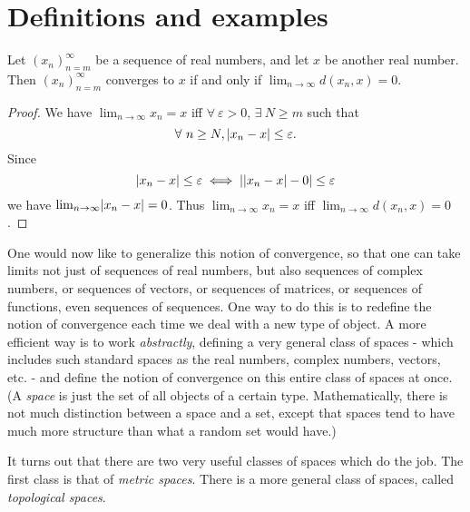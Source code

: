 \section{Definitions and examples}\label{sec 1.1}

\begin{lemma}\label{1.1.1}
    Let \((x_n)_{n = m}^\infty\) be a sequence of real numbers, and let \(x\) be another real number.
    Then \((x_n)_{n = m}^\infty\) converges to \(x\) if and only if \(\lim_{n \to \infty} d(x_n, x) = 0\).
\end{lemma}

\begin{proof}
    We have \(\lim_{n \to \infty} x_n = x\) iff \(\forall\ \varepsilon > 0\), \(\exists\ N \geq m\) such that
    \[
        \forall\ n \geq N, \abs*{x_n - x} \leq \varepsilon.
    \]
    Since
    \[
        \abs*{x_n - x} \leq \varepsilon \iff \abs*{\abs*{x_n - x} - 0} \leq \varepsilon
    \]
    we have \(\lim_{n \to \infty} \abs*{x_n - x} = 0\).
    Thus \(\lim_{n \to \infty} x_n = x\) iff \(\lim_{n \to \infty} d(x_n, x) = 0\).
\end{proof}

\begin{note}
    One would now like to generalize this notion of convergence, so that one can take limits not just of sequences of real numbers, but also sequences of complex numbers, or sequences of vectors, or sequences of matrices, or sequences of functions, even sequences of sequences.
    One way to do this is to redefine the notion of convergence each time we deal with a new type of object.
    A more efficient way is to work \emph{abstractly}, defining a very general class of spaces - which includes such standard spaces as the real numbers, complex numbers, vectors, etc. - and define the notion of convergence on this entire class of spaces at once.
    (A \emph{space} is just the set of all objects of a certain type.
    Mathematically, there is not much distinction between a space and a set, except that spaces tend to have much more structure than what a random set would have.)
\end{note}

\begin{note}
    It turns out that there are two very useful classes of spaces which do the job.
    The first class is that of \emph{metric spaces}.
    There is a more general class of spaces, called \emph{topological spaces}.
\end{note}

